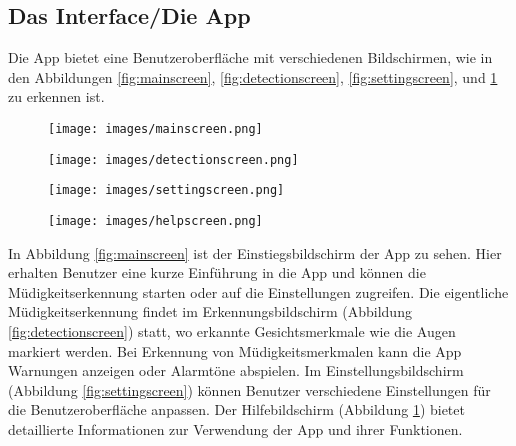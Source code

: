 \subsection{Das Interface/Die App}
\label{ssec:interface}

Die App bietet eine Benutzeroberfläche mit verschiedenen Bildschirmen, wie in den Abbildungen \ref{fig:mainscreen}, \ref{fig:detectionscreen}, \ref{fig:settingscreen}, und \ref{fig:helpscreen} zu erkennen ist.

\begin{figure}[h]
	\centering
	\begin{minipage}[b]{0.22\textwidth}
		\texttt{[image: images/mainscreen.png]}
		\caption{}
		\label{fig:mainscreen}
	\end{minipage}
	\hfill
	\begin{minipage}[b]{0.22\textwidth}
		\texttt{[image: images/detectionscreen.png]}
		\caption{}
		\label{fig:detectionscreen}
	\end{minipage}
	\hfill
	\begin{minipage}[b]{0.22\textwidth}
		\texttt{[image: images/settingscreen.png]}
		\caption{}
		\label{fig:settingscreen}
	\end{minipage}
	\hfill
	\begin{minipage}[b]{0.22\textwidth}
		\texttt{[image: images/helpscreen.png]}
		\caption{}
		\label{fig:helpscreen}
	\end{minipage}
\end{figure}

In Abbildung \ref{fig:mainscreen} ist der Einstiegsbildschirm der App zu sehen. Hier erhalten Benutzer eine kurze Einführung in die App und können die Müdigkeitserkennung starten oder auf die Einstellungen zugreifen. Die eigentliche Müdigkeitserkennung findet im Erkennungsbildschirm (Abbildung \ref{fig:detectionscreen}) statt, wo erkannte Gesichtsmerkmale wie die Augen markiert werden. Bei Erkennung von Müdigkeitsmerkmalen kann die App Warnungen anzeigen oder Alarmtöne abspielen. Im Einstellungsbildschirm (Abbildung \ref{fig:settingscreen}) können Benutzer verschiedene Einstellungen für die Benutzeroberfläche anpassen. Der Hilfebildschirm (Abbildung \ref{fig:helpscreen}) bietet detaillierte Informationen zur Verwendung der App und ihrer Funktionen.
